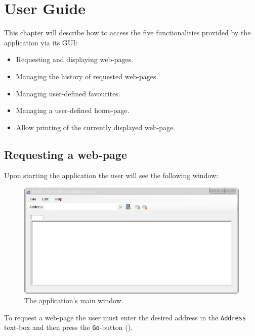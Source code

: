 \chapter{User Guide}\label{ch:user_guide} %

This chapter will describe how to access the five functionalities provided by the application via its \ac{GUI}:

\begin{itemize}
\item Requesting and displaying web-pages.
\item Managing the history of requested web-pages.
\item Managing user-defined favourites.
\item Managing a user-defined home-page.
\item Allow printing of the currently displayed web-page.
\end{itemize}

\section{Requesting a web-page}
\label{sec:request_web_page}

Upon starting the application the user will see the following window:

\begin{figure}[H]
\begin{center}
\includegraphics[width=\textwidth]{gfx/main_window.png}
\caption{The application's main window.}
\label{fig:main_window}
\end{center}
\end{figure}

To request a web-page the user must enter the desired address in the \texttt{Address} text-box and then press the \texttt{Go}-button ().

